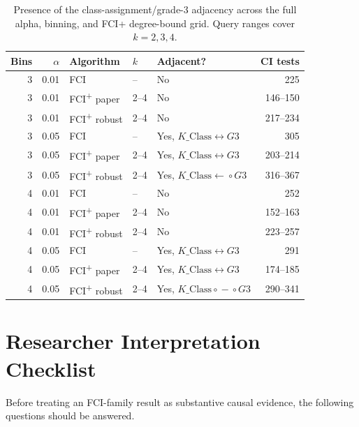 \documentclass[11pt,a4paper,oneside]{report}
\newcommand{\FCIplus}{FCI\textsuperscript{+}}
\begin{document}
\begin{table}[H]
\centering
\caption{Presence of the class-assignment/grade-3 adjacency across the full
alpha, binning, and FCI+ degree-bound grid. Query ranges cover \(k=2,3,4\).}
\begin{tabular}{rrllp{}r}
\toprule
Bins & \(\alpha\) & Algorithm & \(k\) & Adjacent? & CI tests \\
\midrule
3 & 0.01 & FCI & -- & No & 225 \\
3 & 0.01 & \FCIplus{} paper & 2--4 & No & 146--150 \\
3 & 0.01 & \FCIplus{} robust & 2--4 & No & 217--234 \\
3 & 0.05 & FCI & -- & Yes, \(K\_\mathrm{Class}\leftrightarrow G3\) & 305 \\
3 & 0.05 & \FCIplus{} paper & 2--4 &
Yes, \(K\_\mathrm{Class}\leftrightarrow G3\) & 203--214 \\
3 & 0.05 & \FCIplus{} robust & 2--4 &
Yes, \(K\_\mathrm{Class}\leftarrow\!\circ G3\) & 316--367 \\
4 & 0.01 & FCI & -- & No & 252 \\
4 & 0.01 & \FCIplus{} paper & 2--4 & No & 152--163 \\
4 & 0.01 & \FCIplus{} robust & 2--4 & No & 223--257 \\
4 & 0.05 & FCI & -- & Yes, \(K\_\mathrm{Class}\leftrightarrow G3\) & 291 \\
4 & 0.05 & \FCIplus{} paper & 2--4 &
Yes, \(K\_\mathrm{Class}\leftrightarrow G3\) & 174--185 \\
4 & 0.05 & \FCIplus{} robust & 2--4 &
Yes, \(K\_\mathrm{Class}\circ\!-\!\circ G3\) & 290--341 \\
\bottomrule
\end{tabular}
\end{table}

\chapter{Researcher Interpretation Checklist}

Before treating an FCI-family result as substantive causal evidence, the
following questions should be answered.
\end{document}
